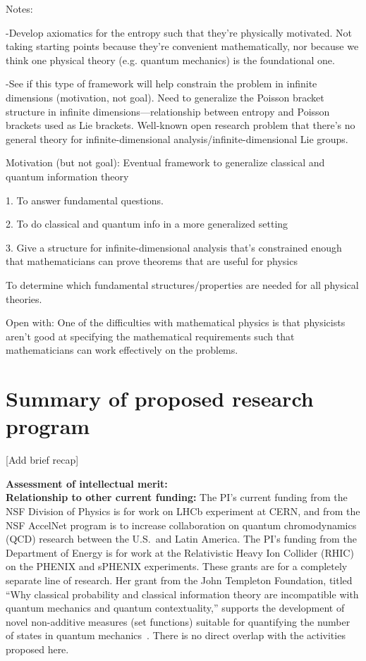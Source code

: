 Notes:

-Develop axiomatics for the entropy such that they’re physically motivated.  Not taking starting points because they’re convenient mathematically, nor because we think one physical theory (e.g. quantum mechanics) is the foundational one.

-See if this type of framework will help constrain the problem in infinite dimensions (motivation, not goal).  Need to generalize the Poisson bracket structure in infinite dimensions—relationship between entropy and Poisson brackets used as Lie brackets.  Well-known open research problem that there’s no general theory for infinite-dimensional analysis/infinite-dimensional Lie groups.

Motivation (but not goal): Eventual framework to generalize classical and quantum information theory

1. To answer fundamental questions.

2. To do classical and quantum info in a more generalized setting

3. Give a structure for infinite-dimensional analysis that’s constrained enough that mathematicians can prove theorems that are useful for physics

To determine which fundamental structures/properties are needed for all physical theories.

Open with: One of the difficulties with mathematical physics is that physicists aren’t good at specifying the mathematical requirements such that mathematicians can work effectively on the problems.



\section{Summary of proposed research program}
[Add brief recap]

\noindent
\textbf{Assessment of intellectual merit:} \\

\noindent
\textbf{Relationship to other current funding:} The PI's current funding from the NSF Division of Physics is for work on LHCb experiment at CERN, and from the NSF AccelNet program is to increase collaboration on quantum chromodynamics (QCD) research between the U.S.~and Latin America.  The PI's funding from the Department of Energy is for work at the Relativistic Heavy Ion Collider (RHIC) on the PHENIX and sPHENIX experiments.  These grants are for a completely separate line of research. Her grant from the John Templeton Foundation, titled ``Why classical probability and classical information theory are incompatible with quantum mechanics and quantum contextuality,'' supports the development of novel non-additive measures (set functions) suitable for quantifying the number of states in quantum mechanics~\cite{aop-nonaddmeas}.  There is no direct overlap with the activities proposed here.  \\

